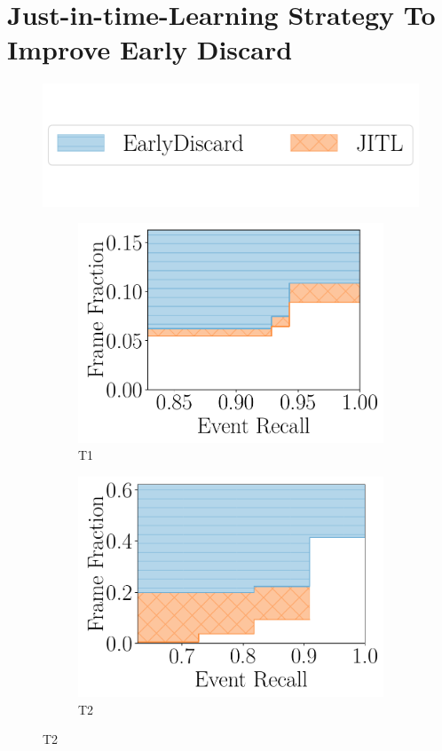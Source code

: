 \section{{\xc Just-in-time-Learning} Strategy To Improve Early Discard}
\label{sec:jitl}

\begin{figure}
    \centering
    \includegraphics[trim={0 1.8cm 0 0},clip,width=0.7\linewidth]{FIGS/fig-jitl-legend.pdf}\\
    \vspace{.5in}
    \begin{subfigure}[b]{.48\linewidth}
    \centering
    \includegraphics[width=\linewidth]{FIGS/fig-jitl-okutama-eventrecall-step.pdf}
    \caption{T1}
    \end{subfigure}
    \begin{subfigure}[b]{.48\linewidth}
    \centering
    \includegraphics[width=\linewidth]{FIGS/fig-jitl-stanford-eventrecall-step.pdf}
    \caption{T2}
    \end{subfigure}


\end{figure}

